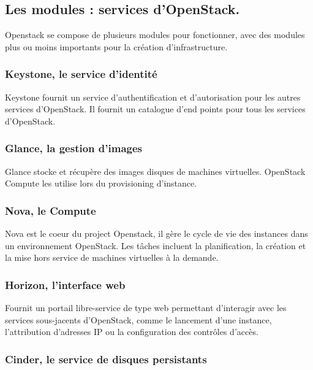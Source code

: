 \documentclass[]{article}
\begin{document}
\subsection{Les modules : services
d'OpenStack.}\label{les-modules-services-dopenstack.}

Openstack se compose de plusieurs modules pour fonctionner, avec des
modules plus ou moins importants pour la création d'infrastructure.

\subsubsection{Keystone, le service
d'identité}\label{keystone-le-service-didentituxe9}

Keystone fournit un service d'authentification et d'autorisation pour les autres
services d'OpenStack. Il fournit un catalogue d'end points pour tous les
services d'OpenStack.

\subsubsection{Glance, la gestion
d'images}\label{glance-la-gestion-dimages}

Glance stocke et récupère des images disques de machines virtuelles. OpenStack
Compute les utilise lors du provisioning d'instance.

\subsubsection{Nova, le Compute}\label{nova-le-compute}

Nova est le coeur du project Openstack, il gère le cycle de vie des
instances dans un environnement OpenStack. Les tâches incluent la
planification, la création et la mise hors service de machines
virtuelles à la demande.

\subsubsection{Horizon, l'interface web}\label{horizon-linterface-web}

Fournit un portail libre-service de type web permettant d'interagir avec
les services sous-jacents d'OpenStack, comme le lancement d'une
instance, l'attribution d'adresses IP ou la configuration des contrôles
d'accès.

\subsubsection{Cinder, le service de disques
persistants}\label{cinder-le-service-de-disques-persistants}
\end{document}
